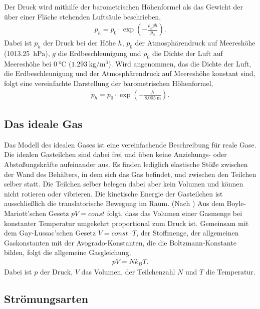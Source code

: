 \noindent
Der Druck wird mithilfe der barometrischen Höhenformel als das Gewicht der über einer Fläche stehenden Luftsäule beschrieben,
\begin{align}
    \label{eqn:baroFormel1}
    p_h = p_0\cdot \exp\left({-\frac{\rho_o gh}{p_0}}\right).
\end{align}
Dabei ist $p_h$ der Druck bei der Höhe $h$, $p_0$ der Atmosphärendruck auf Meereshöhe (\SI{1013,25}{\hecto\pascal}), $g$ die Erdbeschleunigung und $\rho_0$ die Dichte der Luft
auf Meereshöhe bei $\SI{0}{\celsius}$  ($\SI{1,293}{\kilo\gram\per\meter\cubed}$).
Wird angenommen, das die Dichte der Luft, die Erdbeschleunigung und der Atmosphärendruck auf Meereshöhe konstant sind, folgt eine vereinfachte Darstellung der barometrischen
Höhenformel,
\begin{align}
    \label{eqn:baroFormel2}
    p_h = p_0\cdot\exp\left(-\frac{h}{\SI{8,005}{\meter}}\right).
\end{align}

\subsection{Das ideale Gas}
\label{subsec:idGas}

Das Modell des idealen Gases ist eine vereinfachende Beschreibung für reale Gase. Die idealen Gasteilchen sind dabei frei und üben keine Anziehungs- oder Abstoßungskräfte 
aufeinander aus. Es finden lediglich elastische Stöße zwischen der Wand des Behälters, in dem sich das Gas befindet, und zwischen den Teilchen selber statt. Die Teilchen selber
belegen dabei aber kein Volumen und können nicht rotieren oder vibrieren. Die kinetische Energie der Gasteilchen ist ausschließlich die translatorische Bewegung
im Raum. \newline
(Nach \cite{EinfuehrungVakuum}) Aus dem Boyle-Mariott'schen Gesetz $pV=const$ folgt, dass das Volumen einer Gasmenge bei konstanter Temperatur umgekehrt proportional zum Druck
ist. Gemeinsam mit dem Gay-Lussac'schen Gesetz $V=const\cdot T$, der Stoffmenge, der allgemeinen Gaskonstanten mit der Avogrado-Konstanten, die die Boltzmann-Konstante bilden,
folgt die allgemeine Gasgleichung,
\begin{align}
    \label{eqn:allgGasgl}
    pV=Nk_BT.
\end{align}
Dabei ist $p$ der Druck, $V$ das Volumen, der Teilchenzahl $N$ und $T$ die Temperatur.

\subsection{Strömungsarten}
\label{subsec:stroemungsarten}

